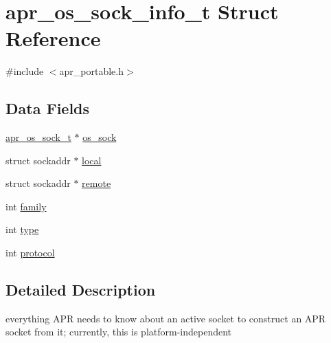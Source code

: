 \hypertarget{structapr__os__sock__info__t}{\section{apr\-\_\-os\-\_\-sock\-\_\-info\-\_\-t Struct Reference}
\label{structapr__os__sock__info__t}
}


{\ttfamily \#include $<$apr\-\_\-portable.\-h$>$}

\subsection*{Data Fields}
\begin{DoxyCompactItemize}
\item 
\hyperlink{group__apr__portabile_ga2965cd2e48cb6513bc0ba05aa6083ed7}{apr\-\_\-os\-\_\-sock\-\_\-t} $\ast$ \hyperlink{structapr__os__sock__info__t_a952464d2f91ca4650e8b4848a81745b5}{os\-\_\-sock}
\item 
struct sockaddr $\ast$ \hyperlink{structapr__os__sock__info__t_afaf470560cbc3088479af708878aa086}{local}
\item 
struct sockaddr $\ast$ \hyperlink{structapr__os__sock__info__t_ae71fe14a5eb9141fc4ad0a6d0a91f17e}{remote}
\item 
int \hyperlink{structapr__os__sock__info__t_aa29fd0cf57b0b5e3559961f068fa8b7e}{family}
\item 
int \hyperlink{structapr__os__sock__info__t_a248fb394cd644b31619f44de0936aa04}{type}
\item 
int \hyperlink{structapr__os__sock__info__t_a176ede3ecf40abf0f82a01bfeb95f1e3}{protocol}
\end{DoxyCompactItemize}


\subsection{Detailed Description}
everything A\-P\-R needs to know about an active socket to construct an A\-P\-R socket from it; currently, this is platform-\/independent 

